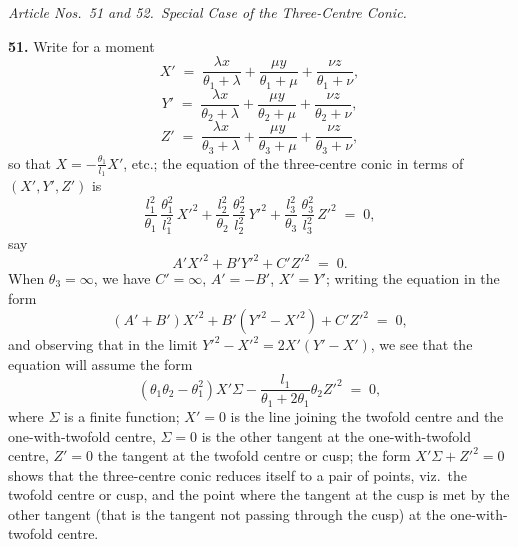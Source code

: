 \documentclass[11pt,a4paper]{article}
\begin{document}
\medskip

\noindent\textit{Article Nos.\ 51 and 52.\ Special Case of the Three-Centre Conic.}

\medskip

\textbf{51.} Write for a moment
\[
X' \;=\; \frac{\lambda x}{\theta_{1}+\lambda} + \frac{\mu y}{\theta_{1}+\mu} + \frac{\nu z}{\theta_{1}+\nu},
\]
\[
Y' \;=\; \frac{\lambda x}{\theta_{2}+\lambda} + \frac{\mu y}{\theta_{2}+\mu} + \frac{\nu z}{\theta_{2}+\nu},
\]
\[
Z' \;=\; \frac{\lambda x}{\theta_{3}+\lambda} + \frac{\mu y}{\theta_{3}+\mu} + \frac{\nu z}{\theta_{3}+\nu},
\]
so that $X = -\tfrac{\theta_{1}}{l_{1}}X'$, etc.; the equation of the three-centre conic in terms of $(X',Y',Z')$ is
\[
\frac{l_{1}^{2}}{\theta_{1}}\,\frac{\theta_{1}^{2}}{l_{1}^{2}}\,X'^{2} + \frac{l_{2}^{2}}{\theta_{2}}\,\frac{\theta_{2}^{2}}{l_{2}^{2}}\,Y'^{2} + \frac{l_{3}^{2}}{\theta_{3}}\,\frac{\theta_{3}^{2}}{l_{3}^{2}}\,Z'^{2} \;=\; 0,
\]
say
\[
A' X'^{2} + B' Y'^{2} + C' Z'^{2} \;=\; 0.
\]
When $\theta_{3}=\infty$, we have $C'=\infty$, $A'=-B'$, $X'=Y'$; writing the equation in the form
\[
(A'+B')X'^{2} + B'(Y'^{2}-X'^{2}) + C'Z'^{2} \;=\; 0,
\]
and observing that in the limit $Y'^{2}-X'^{2} = 2X'(Y'-X')$, we see that the equation will assume the form
\[
(\theta_{1}\theta_{2}-\theta_{1}^{2})X'\Sigma - \frac{l_{1}}{\theta_{1}+2\theta_{1}}\theta_{2}Z'^{2} \;=\; 0,
\]
where $\Sigma$ is a finite function; $X'=0$ is the line joining the twofold centre and the one-with-twofold centre, $\Sigma=0$ is the other tangent at the one-with-twofold centre, $Z'=0$ the tangent at the twofold centre or cusp; the form $X'\Sigma + Z'^{2}=0$ shows that the three-centre conic reduces itself to a pair of points, viz.\ the twofold centre or cusp, and the point where the tangent at the cusp is met by the other tangent (that is the tangent not passing through the cusp) at the one-with-twofold centre.

\medskip
\end{document}
